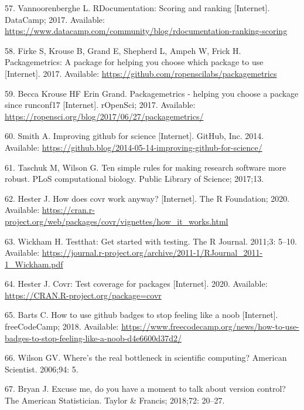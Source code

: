 \documentclass[10pt,letterpaper]{article}
\begin{document}
\leavevmode\hypertarget{ref-vannoorenberghe2017}{}%
57. Vannoorenberghe L. RDocumentation: Scoring and ranking
{[}Internet{]}. DataCamp; 2017. Available:
\url{https://www.datacamp.com/community/blog/rdocumentation-ranking-scoring}

\leavevmode\hypertarget{ref-packagemetrics}{}%
58. Firke S, Krouse B, Grand E, Shepherd L, Ampeh W, Frick H.
Packagemetrics: A package for helping you choose which package to use
{[}Internet{]}. 2017. Available:
\url{https://github.com/ropenscilabs/packagemetrics}

\leavevmode\hypertarget{ref-packagemetricsblog}{}%
59. Becca Krouse HF Erin Grand. Packagemetrics - helping you choose a
package since runconf17 {[}Internet{]}. rOpenSci; 2017. Available:
\url{https://ropensci.org/blog/2017/06/27/packagemetrics/}

\leavevmode\hypertarget{ref-smith2014}{}%
60. Smith A. Improving github for science {[}Internet{]}. GitHub, Inc.
2014. Available:
\url{https://github.blog/2014-05-14-improving-github-for-science/}

\leavevmode\hypertarget{ref-taschuk2017}{}%
61. Taschuk M, Wilson G. Ten simple rules for making research software
more robust. PLoS computational biology. Public Library of Science;
2017;13.

\leavevmode\hypertarget{ref-hester2020}{}%
62. Hester J. How does covr work anyway? {[}Internet{]}. The R
Foundation; 2020. Available:
\url{https://cran.r-project.org/web/packages/covr/vignettes/how_it_works.html}

\leavevmode\hypertarget{ref-wickham2011}{}%
63. Wickham H. Testthat: Get started with testing. The R Journal.
2011;3: 5--10. Available:
\url{https://journal.r-project.org/archive/2011-1/RJournal_2011-1_Wickham.pdf}

\leavevmode\hypertarget{ref-covr}{}%
64. Hester J. Covr: Test coverage for packages {[}Internet{]}. 2020.
Available: \url{https://CRAN.R-project.org/package=covr}

\leavevmode\hypertarget{ref-barts2018}{}%
65. Barts C. How to use github badges to stop feeling like a noob
{[}Internet{]}. freeCodeCamp; 2018. Available:
\url{https://www.freecodecamp.org/news/how-to-use-badges-to-stop-feeling-like-a-noob-d4e6600d37d2/}

\leavevmode\hypertarget{ref-wilson2006}{}%
66. Wilson GV. Where's the real bottleneck in scientific computing?
American Scientist. 2006;94: 5.

\leavevmode\hypertarget{ref-bryan2018}{}%
67. Bryan J. Excuse me, do you have a moment to talk about version
control? The American Statistician. Taylor \& Francis; 2018;72: 20--27.
\end{document}

